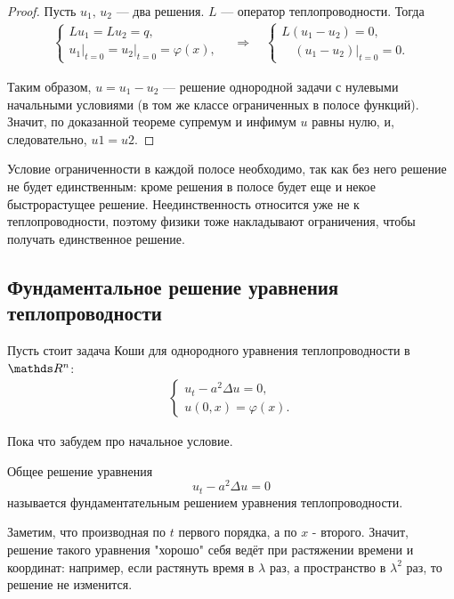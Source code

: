 \begin{proof}
Пусть $u_1, \, u_2 $ --- два решения. $L$ --- оператор теплопроводности.  Тогда
\begin{align*}
	\begin{cases*}
		Lu_1 = Lu_2 = q, \\
		u_1\Big\rvert_{t=0} = u_2\Big\rvert_{t=0} = \varphi(x),
	\end{cases*}
	\quad \Rightarrow \quad
	\begin{cases*}
		L(u_1 - u_2) = 0, \\
		\quad (u_1-u_2) \Big\rvert_{t=0}=0.
	\end{cases*}
\end{align*}

Таким образом, $u = u_1 - u_2$ --- решение однородной задачи с нулевыми начальными условиями (в том же классе ограниченных в полосе функций). Значит, по доказанной теореме супремум и инфимум $u$ равны нулю, и, следовательно, $u1 = u2$.

\end{proof}

\begin{note}
Условие ограниченности в каждой полосе необходимо, так как без него решение не будет единственным: кроме решения в полосе будет еще и некое быстрорастущее решение. Неединственность относится уже не к теплопроводности, поэтому физики тоже накладывают ограничения, чтобы получать единственное решение.
\end{note}


\subsection{Фундаментальное решение уравнения теплопроводности}
Пусть стоит задача Коши для однородного уравнения теплопроводности в $\real^n$:
\begin{align*}
	\begin{cases*}
		u_t - a^2 \Delta u = 0, \\
		u(0,x) = \varphi(x).
	\end{cases*}
\end{align*}

Пока что забудем про начальное условие.

\begin{definition} Общее решение уравнения
$$ u_t - a^2 \Delta u = 0$$
называется фундаментательным решением уравнения теплопроводности.
\end{definition}

Заметим, что производная по $t$ первого порядка, а по $x$ - второго. Значит, решение такого уравнения "хорошо" себя ведёт при растяжении времени и координат: например, если растянуть время в $\lambda$ раз, а пространство в $\lambda^2$ раз, то решение не изменится.

